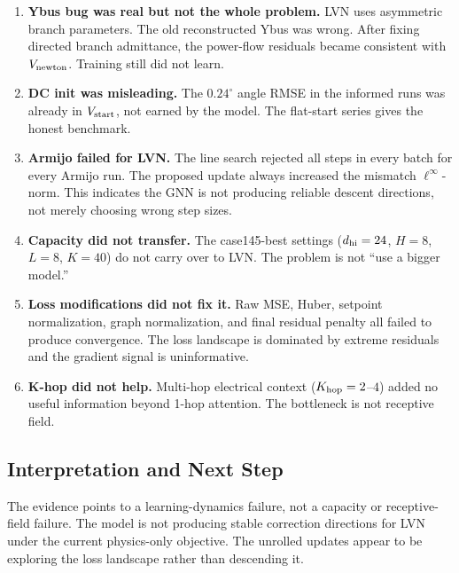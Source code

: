 \documentclass{article}
\begin{document}
\begin{enumerate}[noitemsep]
  \item \textbf{Ybus bug was real but not the whole problem.}
    LVN uses asymmetric branch parameters.  The old reconstructed Ybus was
    wrong.  After fixing directed branch admittance, the power-flow
    residuals became consistent with $V_{\rm newton}$.  Training still did
    not learn.

  \item \textbf{DC init was misleading.}
    The $0.24^\circ$ angle RMSE in the informed runs was already in
    $V_{\rm start}$, not earned by the model.  The flat-start series gives
    the honest benchmark.

  \item \textbf{Armijo failed for LVN.}
    The line search rejected all steps in every batch for every Armijo
    run.  The proposed update always increased the mismatch $\ell^\infty$-norm.
    This indicates the GNN is not producing reliable descent directions,
    not merely choosing wrong step sizes.

  \item \textbf{Capacity did not transfer.}
    The case145-best settings ($d_{\rm hi}=24$, $H=8$, $L=8$, $K=40$) do
    not carry over to LVN.  The problem is not ``use a bigger model.''

  \item \textbf{Loss modifications did not fix it.}
    Raw MSE, Huber, setpoint normalization, graph normalization, and final
    residual penalty all failed to produce convergence.  The loss landscape
    is dominated by extreme residuals and the gradient signal is
    uninformative.

  \item \textbf{K-hop did not help.}
    Multi-hop electrical context ($K_{\rm hop}=2$--$4$) added no useful
    information beyond 1-hop attention.  The bottleneck is not receptive
    field.
\end{enumerate}

\subsection{Interpretation and Next Step}

The evidence points to a learning-dynamics failure, not a capacity or
receptive-field failure.  The model is not producing stable correction
directions for LVN under the current physics-only objective.  The unrolled
updates appear to be exploring the loss landscape rather than descending it.
\end{document}
